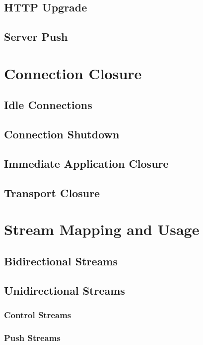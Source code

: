 \documentclass{article}
\begin{document}
\subsection{HTTP Upgrade}

\subsection{Server Push}

\section{Connection Closure}

\subsection{Idle Connections}

\subsection{Connection Shutdown}

\subsection{Immediate Application Closure}

\subsection{Transport Closure}

\section{Stream Mapping and Usage}

\subsection{Bidirectional Streams}

\subsection{Unidirectional Streams}

\subsubsection{Control Streams}

\subsubsection{Push Streams}
\end{document}
